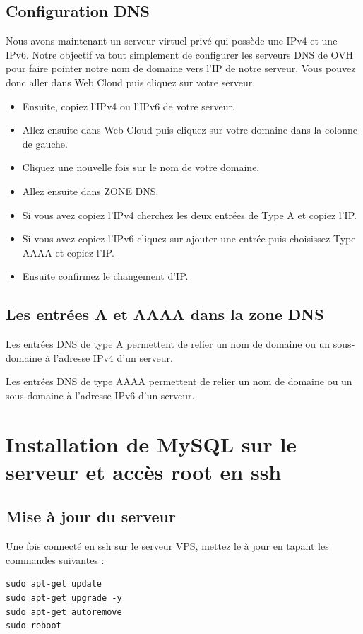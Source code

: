 \documentclass{article}
\begin{document}
\subsection{Configuration DNS}
Nous avons maintenant un serveur virtuel privé qui possède une IPv4 et une IPv6. Notre objectif va tout simplement de configurer les serveurs DNS de OVH pour faire pointer notre nom de domaine vers l'IP de notre serveur. Vous pouvez donc aller dans Web Cloud puis cliquez sur votre serveur.
\begin{itemize}
\item Ensuite, copiez l'IPv4 ou l'IPv6 de votre serveur. 
\item Allez ensuite dans Web Cloud puis cliquez sur votre domaine dans la colonne de gauche.
\item Cliquez une nouvelle fois sur le nom de votre domaine.
\item Allez ensuite dans ZONE DNS.
\item Si vous avez copiez l'IPv4 cherchez les deux entrées de Type A et copiez l'IP.
\item Si vous avez copiez l'IPv6 cliquez sur ajouter une entrée puis choisissez Type AAAA et copiez l'IP.
\item Ensuite confirmez le changement d'IP.
\end{itemize}
\subsection{Les entrées A et AAAA dans la zone DNS}
Les entrées DNS de type A permettent de relier un nom de domaine ou un sous-domaine à l'adresse IPv4 d'un serveur.

Les entrées DNS de type AAAA permettent de relier un nom de domaine ou un sous-domaine à l'adresse IPv6 d'un serveur.

\section{Installation de MySQL sur le serveur et accès root en ssh}
\subsection{Mise à jour du serveur}
Une fois connecté en ssh sur le serveur VPS, mettez le à jour en tapant les commandes suivantes :
\begin{verbatim}
sudo apt-get update
sudo apt-get upgrade -y
sudo apt-get autoremove
sudo reboot
\end{verbatim}
\end{document}
